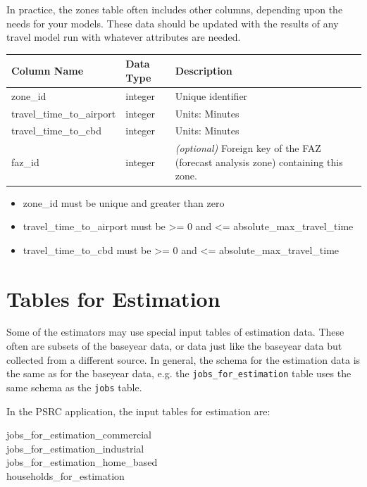 In practice, the zones table often includes other columns, depending upon the
needs for your models.  These data should be updated with the results of any
travel model run with whatever attributes are needed.

\begin{tabular}{|l|l|p{3.5in}|}
\hline
\textbf{Column Name} & \textbf{Data Type} & \textbf{Description} \\
\hline zone_id & integer & Unique identifier  \\

\hline travel_time_to_airport & integer & Units: Minutes  \\

\hline travel_time_to_cbd & integer & Units: Minutes  \\

\hline faz_id & integer & \emph{(optional) } Foreign key of the FAZ (forecast
analysis zone) containing this zone.   \\

\hline
\end{tabular}

\begin{itemize} \tight
\item zone_id must be unique and greater than zero
\item travel_time_to_airport must be \textgreater{}= 0 and \textless{}= absolute_max_travel_time
\item travel_time_to_cbd must be \textgreater{}= 0 and \textless{}= absolute_max_travel_time

\end{itemize}

\section{Tables for Estimation}

Some of the estimators may use special input tables of estimation data.  These
often are subsets of the baseyear data, or data just like the baseyear data but
collected from a different source.  In general, the schema for the estimation
data is the same as for the baseyear data, e.g. the \verb|jobs_for_estimation|
table uses the same schema as the \verb|jobs| table.

In the PSRC application, the input tables for estimation are:

\begin{description}
\item[jobs_for_estimation_commercial]
\item[jobs_for_estimation_industrial]
\item[jobs_for_estimation_home_based]
\item[households_for_estimation]
\end{description}

